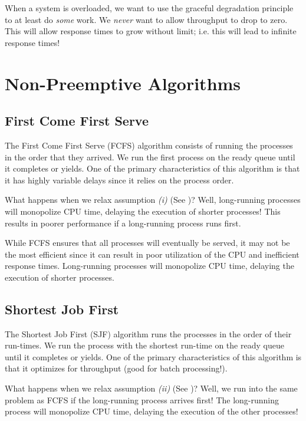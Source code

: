 \documentclass{report}
\newcommand{\bookBegin}[1]{\begin{tcolorbox}[colback=black!5!white,colframe=black!75!black,title={\textit{Operating Systems, Three Easy Pieces: #1}}]}
\newcommand{\bookEnd}{\end{tcolorbox}}
\begin{document}
When a system is overloaded, we want to use the graceful degradation principle to at least do
\textit{some} work. We \textit{never} want to allow throughput to drop to zero. This will allow
response times to grow without limit; i.e. this will lead to infinite response times!





\section{Non-Preemptive Algorithms}


\subsection{First Come First Serve}
The First Come First Serve (FCFS) algorithm consists of running the processes in the order that they
arrived. We run the first process on the ready queue until it completes or yields. One of the
primary characteristics of this algorithm is that it has highly variable delays since it relies on
the process order.

\bookBegin{FIFO/FCFS}
What happens when we relax assumption \textit{(i)} (See \textbf{})? Well,
long-running processes will monopolize CPU time, delaying the execution of shorter processes! This
results in poorer performance if a long-running process runs first.
\bookEnd

While FCFS ensures that all processes will eventually be served, it may not be the most efficient
since it can result in poor utilization of the CPU and inefficient response times. Long-running
processes will monopolize CPU time, delaying the execution of shorter processes.


\subsection{Shortest Job First}
The Shortest Job First (SJF) algorithm runs the processes in the order of their run-times. We run
the process with the shortest run-time on the ready queue until it completes or yields. One of the
primary characteristics of this algorithm is that it optimizes for throughput (good for batch
processing!).

\bookBegin{FIFO/FCFS}
What happens when we relax assumption \textit{(ii)} (See \textbf{})? Well, we
run into the same problem as FCFS if the long-running process arrives first! The long-running
process will monopolize CPU time, delaying the execution of the other processes! 
\bookEnd
\end{document}
